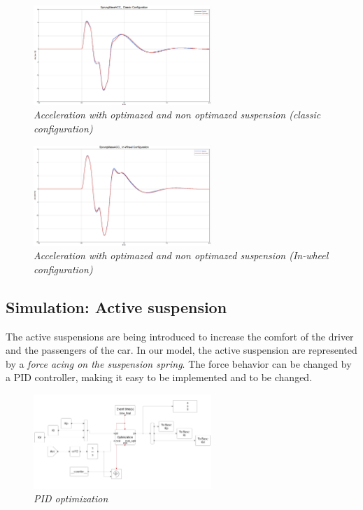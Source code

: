 \documentclass{article}
\numberwithin{equation}{section}
\numberwithin{figure}{section}
\numberwithin{table}{section}
\numberwithin{table}{section}
\begin{document}
\begin{figure}[H]
    \centering
    \includegraphics[width=0.6\textwidth]{Pictures/Passive (Classic Optimization).png}
    \caption{\emph{Acceleration with optimazed and non optimazed suspension (classic configuration)}}
    \label{fig:classic opt}
\end{figure}


\begin{figure}[H]
    \centering
    \includegraphics[width=0.6\textwidth]{Pictures/Passive (InWheel optimization).png}
    \caption{\emph{Acceleration with optimazed and non optimazed suspension (In-wheel configuration)}}
    \label{fig:InWheel opt}
\end{figure}
\subsection{Simulation: Active suspension}
The active suspensions are being introduced to increase the comfort of the driver and the passengers of the car. In our model, the active suspension are represented by a \emph{force acing on the suspension spring}. The force behavior can be changed by a PID controller, making it easy to be implemented and to be changed.

\begin{figure}[H]
    \centering
    \includegraphics[width=0.6\textwidth]{Pictures/PID optimization.png}
    \caption{\emph{PID optimization}}
    \label{fig:PID algorithm}
\end{figure}
\end{document}
